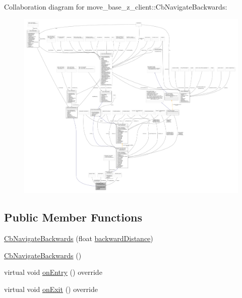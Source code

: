 Collaboration diagram for move\+\_\+base\+\_\+z\+\_\+client\+:\+:Cb\+Navigate\+Backwards\+:
\nopagebreak
\begin{figure}[H]
\begin{center}
\leavevmode
\includegraphics[width=350pt]{classmove__base__z__client_1_1CbNavigateBackwards__coll__graph}
\end{center}
\end{figure}
\subsection*{Public Member Functions}
\begin{DoxyCompactItemize}
\item 
\hyperlink{classmove__base__z__client_1_1CbNavigateBackwards_a47e9482418fa6f26f7648b5e0d00800c}{Cb\+Navigate\+Backwards} (float \hyperlink{classmove__base__z__client_1_1CbNavigateBackwards_a53d06922eff285e4d35f4d7b1b7b7752}{backward\+Distance})
\item 
\hyperlink{classmove__base__z__client_1_1CbNavigateBackwards_a2536e2c30a2dbf13b19d08aca3539736}{Cb\+Navigate\+Backwards} ()
\item 
virtual void \hyperlink{classmove__base__z__client_1_1CbNavigateBackwards_ae5c9eb5029e0a6ea6950cb23713214bb}{on\+Entry} () override
\item 
virtual void \hyperlink{classmove__base__z__client_1_1CbNavigateBackwards_a1160c6f750789c4e88f46c54a3df2a1e}{on\+Exit} () override
\end{DoxyCompactItemize}
